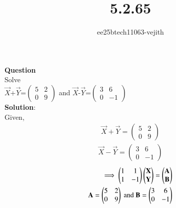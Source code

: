\documentclass[journal]{IEEEtran}
\begin{document}

\vspace{3cm}

\title{5.2.65}
\author{ee25btech11063-vejith}

\maketitle
{\let\newpage\relax\maketitle}
\renewcommand{\thefigure}{\theenumi}
\renewcommand{\thetable}{\theenumi}
\setlength{\intextsep}{10pt} %
\textbf{Question}\\
Solve\\
$\Vec{X}$+$\Vec{Y}$=$\begin{pmatrix}
    5 & 2\\
    0 & 9
\end{pmatrix}$ and $\Vec{X}$-$\Vec{Y}$=$\begin{pmatrix}
    3 & 6\\
    0 & -1
\end{pmatrix}$\\
\textbf{Solution}:\\
Given,
\begin{align}
    \Vec{X}+\Vec{Y}=\begin{pmatrix}
    5 & 2\\
    0 & 9
    \end{pmatrix}
\end{align}
\begin{align}
    \Vec{X}-\Vec{Y}=\begin{pmatrix}
    3 & 6\\
    0 & -1
\end{pmatrix}
\end{align}
\begin{align}
    \implies \begin{pmatrix}
        1 & 1\\
         1 & -1
    \end{pmatrix} \begin{pmatrix}\mathbf{X}\\\mathbf{Y}\end{pmatrix}=\begin{pmatrix}\mathbf{A}\\ \mathbf{B}\end{pmatrix}\\
     \mathbf{A}= \begin{pmatrix}
    5 & 2\\
    0 & 9
\end{pmatrix} \text{ and } \mathbf{B}=\begin{pmatrix}
    3 & 6\\
    0 & -1
\end{pmatrix}
    \end{align}
\end{document}
